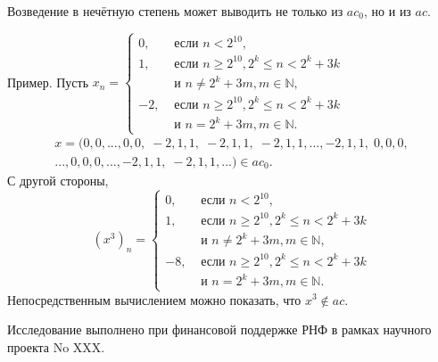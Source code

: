 \documentclass[14pt, a4paper]{extbook}
\begin{document}
Возведение в нечётную степень может выводить не только из $ac_0$,
но и из $ac$.

Пример.
	Пусть
	$
		x_n = \begin{cases}
			 0, & \mbox{~если~} n < 2^{10},
			\\
			 1, & \mbox{~если~} n \ge 2^{10}, 2^k\le n < 2^k+3k
			\\
				& \mbox{~и~}  n\neq 2^k + 3m, m\in\mathbb{N},
			\\
			-2, & \mbox{~если~} n \ge 2^{10}, 2^k\le n < 2^k+3k
			\\
				& \mbox{~и~}  n  =  2^k + 3m, m\in\mathbb{N}.
		\end{cases}
	$
	\begin{multline*}
		x = (0,0,...,0,0, \; -2, 1, 1, \; -2, 1, 1, \; -2, 1, 1, ..., -2, 1, 1, \; 0, 0, 0, \\ ..., 0, 0, 0, ..., -2, 1, 1, \; -2, 1, 1, ... ) \in ac_0
		.
	\end{multline*}
	С другой стороны,
		\begin{equation*}
		(x^3)_n = \begin{cases}
			 0, & \mbox{~если~} n < 2^{10},
			\\
			 1, & \mbox{~если~} n \ge 2^{10}, 2^k\le n < 2^k+3k
			\\
				& \mbox{~и~}  n\neq 2^k + 3m, m\in\mathbb{N},
			\\
			-8, & \mbox{~если~} n \ge 2^{10}, 2^k\le n < 2^k+3k
			\\
				& \mbox{~и~}  n  =  2^k + 3m, m\in\mathbb{N}.
		\end{cases}
	\end{equation*}
	Непосредственным вычислением можно показать, что $x^3 \notin ac$.





{\small Исследование выполнено при финансовой поддержке РНФ в рамках научного проекта No XXX.} %

\end{document}

